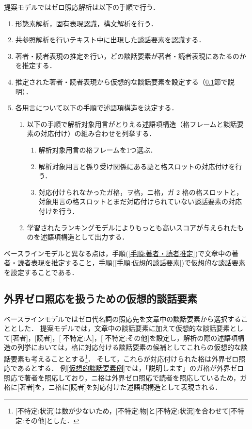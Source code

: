 \documentclass[japanese]{jnlp_1.4}
\begin{document}
提案モデルではゼロ照応解析は以下の手順で行う．
\begin{enumerate}
 \item 形態素解析，固有表現認識，構文解析を行う．
 \item 共参照解析を行いテキスト中に出現した談話要素を認識する．
 \item 著者・読者表現の推定を行い，どの談話要素が著者・読者表現にあたるのかを推定する．\label{手順:著者・読者推定}
 \item 推定された著者・読者表現から仮想的な談話要素を設定する（\ref{節:仮想的談話要素}節で説明）．\label{手順:仮想的談話要素}
 \item 各用言について以下の手順で述語項構造を決定する．
\begin{enumerate}
 		\item 以下の手順で解析対象用言がとりえる述語項構造（格フレームと談話要素の対応付け）の組み合わせを列挙する．
			  \begin{enumerate}
			   \item 解析対象用言の格フレームを1つ選ぶ．
			   \item 解析対象用言と係り受け関係にある語と格スロットの対応付けを行う．
			   \item 対応付けられなかったガ格，ヲ格，ニ格，ガ 2 格の格スロットと，対象用言の格スロットとまだ対応付けられていない談話要素の対応付けを行う．
			  \end{enumerate}
 \item 学習されたランキングモデルによりもっとも高いスコアが与えられたものを述語項構造として出力する．
\end{enumerate}
\end{enumerate}

ベースラインモデルと異なる点は，手順(\ref{手順:著者・読者推定})で文章中の著者・読者表現を推定すること，手順(\ref{手順:仮想的談話要素})で仮想的な談話要素を設定することである．


\subsection{外界ゼロ照応を扱うための仮想的談話要素}
\label{節:仮想的談話要素}

ベースラインモデルではゼロ代名詞の照応先を文章中の談話要素から選択することとした．
提案モデルでは，文章中の談話要素に加えて仮想的な談話要素として[著者]，[読者]，[ 不特定:人]，[ 不特定:その他]を設定し，解析の際の述語項構造の列挙においては，格に対応付ける談話要素の候補としてこれらの仮想的な談話要素も考えることとする\footnote{[不特定:状況]は数が少ないため，[不特定:物]と[不特定:状況]を合わせて[不特定:その他]とした．}．
そして，これらが対応付けられた格は外界ゼロ照応であるとする．
例\ref{仮想的談話要素例}では，「説明します」のガ格が外界ゼロ照応で著者を照応しており，ニ格は外界ゼロ照応で読者を照応しているため，ガ格に[著者]を，ニ格に[読者]を対応付けた述語項構造として表現される．
\end{document}
